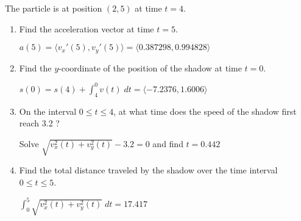 \documentclass[11pt,answers]{exam}
\begin{document}
The particle is at position $(2,5)$ at time $t=4$.
\begin{enumerate}
\item Find the acceleration vector at time $t=5$.

$a(5) = \langle v_x'(5),v_y'(5) \rangle = \langle 0.387298, 0.994828 \rangle$

\item Find the $y$-coordinate of the position of the shadow at time $t=0$.

$s(0) = s(4) + \displaystyle \int_4^0 v(t) \; dt = \langle -7.2376, 1.6006 \rangle$

\item On the interval $0 \leq t \leq 4$, at what time does the speed
of the shadow first reach 3.2 ?

Solve $\sqrt{v_x^2(t)+v_y^2(t)}-3.2 = 0$ and find $t = 0.442$

\item Find the total distance traveled by the shadow over the
 time interval $0 \leq t \leq 5$.

 $\displaystyle \int_0^5 \sqrt{v_x^2(t)+v_y^2(t)} \; dt = 17.417$

\end{enumerate}
\end{document}
